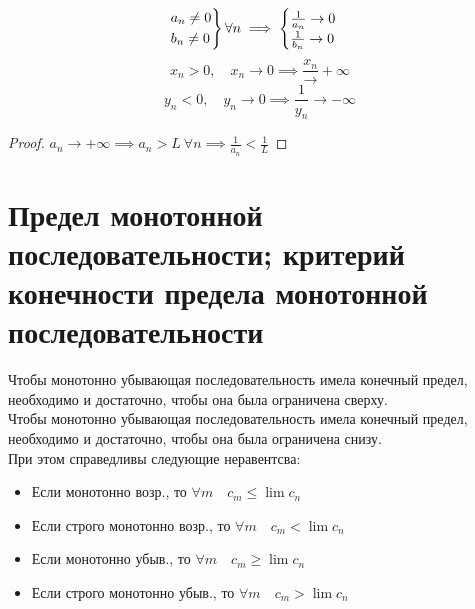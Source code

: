 \begin{property}
	$$ \begin{rcases}
	   	a_n \ne 0 \\
		b_n \ne 0
	\end{rcases} \forall n \implies
	\begin{cases}
		\frac1{a_n} \to 0 \\
		\frac1{b_n} \to 0
    \end{cases} $$
	$$ x_n > 0, \quad x_n \to 0 \implies \frac{x_n} \to + \infty $$
	$$ y_n < 0, \quad y_n \to 0 \implies \frac1{y_n} \to - \infty $$
\end{property}

\begin{proof}
	$ a_n \to + \infty \implies a_n > L ~ \forall n \implies \frac1{a_n} < \frac1L $
\end{proof}

\section{Предел монотонной последовательности; критерий конечности предела монотонной последовательности}

\begin{theorem}
	Чтобы монотонно убывающая последовательность имела конечный предел, необходимо и достаточно, чтобы она была ограничена сверху. \\
	Чтобы монотонно убывающая последовательность имела конечный предел, необходимо и достаточно, чтобы она была ограничена снизу. \\
	При этом справедливы следующие неравентсва:
	\begin{itemize}
		\item Если монотонно возр., то $\forall m \quad c_m \le \lim c_n $
		\item Если строго монотонно возр., то $ \forall m \quad c_m < \lim c_n $
		\item Если монотонно убыв., то $ \forall m \quad c_m \ge \lim c_n $
		\item Если строго монотонно убыв., то $ \forall m \quad c_m > \lim c_n $
	\end{itemize}
\end{theorem}

